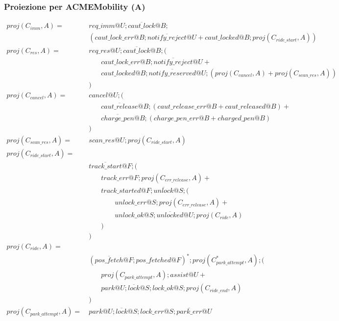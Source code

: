 \subsubsection{Proiezione per ACMEMobility (A)}
\begin{align*}
proj(C_{imm}, A) = & \ req\_imm@U ; \overline{caut\_lock}@B ; \\
& \ ( caut\_lock\_err@B ; \overline{notify\_reject}@U + caut\_locked@B ; proj(C_{ride\_start}, A) ) \\
proj(C_{res}, A) = & \ req\_res@U ; \overline{caut\_lock}@B ; ( \\
& \quad \quad caut\_lock\_err@B ; \overline{notify\_reject}@U + \\
& \quad \quad caut\_locked@B ; \overline{notify\_reserved}@U ; (proj(C_{cancel}, A) + proj(C_{scan\_res}, A)) \\
& \ ) \\
proj(C_{cancel}, A) = & \ cancel@U ; ( \\
& \quad \quad \overline{caut\_release}@B ; (caut\_release\_err@B + caut\_released@B) + \\
& \quad \quad \overline{charge\_pen}@B ; (charge\_pen\_err@B + charged\_pen@B) \\
& \ ) \\
proj(C_{scan\_res}, A) = & \ scan\_res@U ; proj(C_{ride\_start}, A) \\
proj(C_{ride\_start}, A) = \\
& \ \overline{track\_start}@F ; ( \\
& \quad \quad track\_err@F ; proj(C_{err\_release}, A) + \\
& \quad \quad track\_started@F ; \overline{unlock}@S ; ( \\
& \quad \quad \quad \quad unlock\_err@S ; proj(C_{err\_release}, A) + \\
& \quad \quad \quad \quad unlock\_ok@S ; \overline{unlocked}@U ; proj(C_{ride}, A) \\
& \quad \quad ) \\
& \ ) \\
proj(C_{ride}, A) = \\
& \ {(\overline{pos\_fetch}@F ; pos\_fetched@F )}^* ; proj(C_{park\_attempt}^*, A) ; ( \\
& \quad \quad proj(C_{park\_attempt}, A) ; assist@U + \\
& \quad \quad park@U ; \overline{lock}@S ; lock\_ok@S ; proj(C_{ride\_end}, A) \\
& \ ) \\
proj(C_{park\_attempt}, A) = & \ park@U ; \overline{lock}@S ; lock\_err@S ; \overline{park\_err}@U \\

\end{align*}
